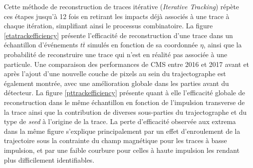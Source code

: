 Cette méthode de reconstruction de traces itérative (\textit{Iterative Tracking}) \cite{IterativeTracking} répète ces étapes jusqu'à 12 fois en retirant les impacts déjà associés à une trace à chaque itération, simplifiant ainsi le processus combinatoire. La figure \ref{etatrackefficiency} présente l'efficacité de reconstruction d'une trace dans un échantillon d'événements $t\overline{t}$ simulés en fonction de sa coordonnée $\eta$, ainsi que la probabilité de reconstruire une trace qui n'est en réalité pas associée à une particule. Une comparaison des performances de CMS entre 2016 et 2017 avant et après l'ajout d'une nouvelle couche de pixels au sein du trajectographe est également montrée, avec une amélioration globale dans les parties avant du détecteur. La figure \ref{pttrackefficiency} présente quant à elle l'efficacité globale de reconstruction dans le même échantillon en fonction de l'impulsion transverse de la trace ainsi que la contribution de diverses sous-parties du trajectographe et du type de \textit{seed} à l'origine de la trace. La perte d'efficacité observée aux extrema dans la même figure s'explique principalement par un effet d'enroulement de la trajectoire sous la contrainte du champ magnétique pour les traces à basse impulsion, et par une faible courbure pour celles à haute impulsion les rendant plus difficilement identifiables. \\

